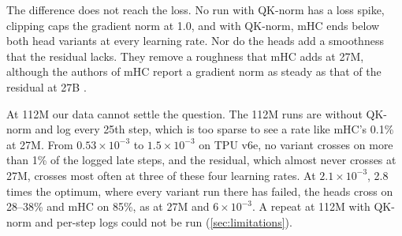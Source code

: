 \documentclass[11pt, a4paper]{article}
\newcommand{\lr}[1]{\ensuremath{#1 \times 10^{-3}}}
\begin{document}
The difference does not reach the loss. No run with QK-norm has a loss spike, clipping caps the gradient norm at 1.0, and with QK-norm, mHC ends
below both head variants at every learning rate. Nor do the heads add a smoothness that the residual lacks. They remove a roughness
that mHC adds at 27M, although the authors of mHC report a gradient norm as steady as that of the residual at 27B
\citep{xie2026mhc}.

At 112M our data cannot settle the question. The 112M runs are without QK-norm and log every 25th step, which is too sparse to see
a rate like mHC's 0.1\% at 27M. From \lr{0.53} to \lr{1.5} on TPU v6e, no variant crosses on more than 1\% of the logged late steps, and the
residual, which almost never crosses at 27M, crosses most often at three of these four learning rates. At \lr{2.1}, 2.8 times the
optimum, where every variant run there has failed, the heads cross on 28--38\% and mHC on 85\%, as at 27M and \lr{6}. A repeat at 112M with
QK-norm and per-step logs could not be run (\cref{sec:limitations}).
\end{document}
